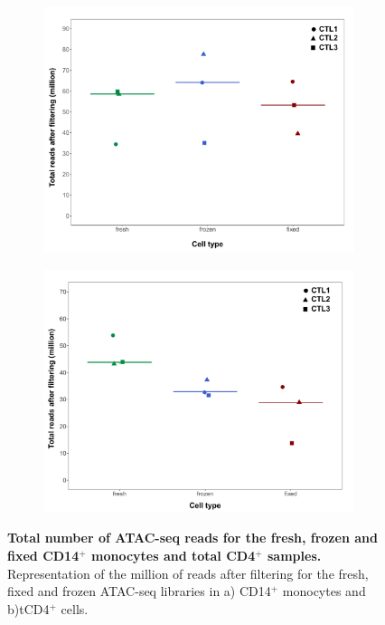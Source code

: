 \begin{figure}[htbp]
\centering
\begin{subfigure}{0.5\textwidth}
\centering
\includegraphics[width=\textwidth]{./Results1/pdfs/Core_ATAC_CD14_fresh_frozen_fixed_filtered_total_reads}
\caption{\textbf{}}
\end{subfigure}%
\begin{subfigure}{0.5\textwidth}
\centering
\includegraphics[width=\textwidth]{./Results1/pdfs/Core_ATAC_CD4_fresh_frozen_fixed_filtered_total_reads}
\caption{\textbf{}}
\end{subfigure}
\caption[Total number of ATAC-seq reads for the fresh, frozen and fixed CD14$^+$ monocytes and total CD4$^+$ samples.]{\textbf{Total number of ATAC-seq reads for the fresh, frozen and fixed CD14$^+$ monocytes and total CD4$^+$ samples.} Representation of the million of reads after filtering for the fresh, fixed and frozen ATAC-seq libraries in a) CD14$^+$ monocytes and b)tCD4$^+$ cells.}
\label{figure:Core_ATAC_all_conditions_total_reads}
\end{figure} 

